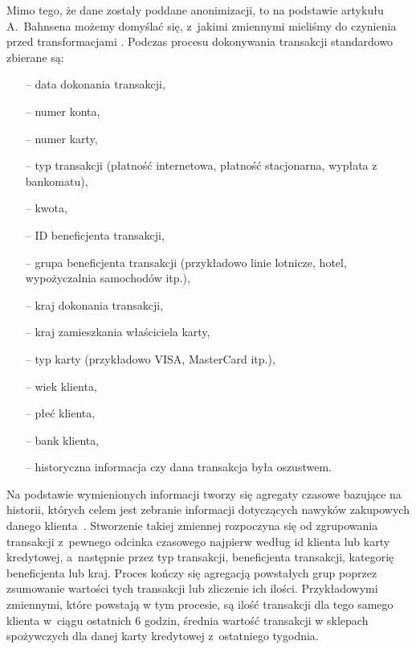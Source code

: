 \documentclass[inzynierska]{pwr_wmat_praca_dyplomowa}
\theoremstyle{plain}
\numberwithin{theorem}{chapter}
\theoremstyle{definition}
\numberwithin{theorem}{chapter}
\begin{document}
Mimo tego, że dane zostały poddane anonimizacji, to na podstawie artykułu A.~Bahnsena możemy domyślać się, z~jakimi zmiennymi mieliśmy do czynienia przed transformacjami \cite{CSCCFD}. Podczas procesu dokonywania transakcji standardowo zbierane są: 
\begin{itemize}
	\item[--] data dokonania transakcji, 
	\item[--] numer konta,
	\item[--] numer karty,
	\item[--] typ transakcji (płatność internetowa, płatność stacjonarna, wypłata z bankomatu),
	\item[--] kwota, 
	\item[--] ID beneficjenta transakcji,
	\item[--] grupa beneficjenta transakcji (przykładowo linie lotnicze, hotel, wypożyczalnia samochodów itp.), 
	\item[--] kraj dokonania transakcji,
	\item[--] kraj zamieszkania właściciela karty,
	\item[--] typ karty (przykładowo VISA, MasterCard itp.),
	\item[--] wiek klienta, 
 	\item[--] płeć klienta,
	\item[--] bank klienta,
	\item[--] historyczna informacja czy dana transakcja była oszustwem.
\end{itemize}
\noindent Na podstawie wymienionych informacji tworzy się agregaty czasowe bazujące na historii, których celem jest zebranie informacji dotyczących nawyków zakupowych danego klienta~\cite{bahnsen_presentation}. Stworzenie takiej zmiennej rozpoczyna się od zgrupowania transakcji z~pewnego odcinka czasowego najpierw według id klienta lub karty kredytowej, a~następnie przez typ transakcji, beneficjenta transakcji, kategorię beneficjenta lub kraj. Proces kończy się agregacją powstałych grup poprzez zsumowanie wartości tych transakcji lub zliczenie ich ilości. Przykładowymi zmiennymi, które powstają w tym procesie, są ilość transakcji dla tego samego klienta w~ciągu ostatnich 6 godzin, średnia wartość transakcji w sklepach spożywczych dla danej karty kredytowej z~ostatniego tygodnia. 
\end{document}

